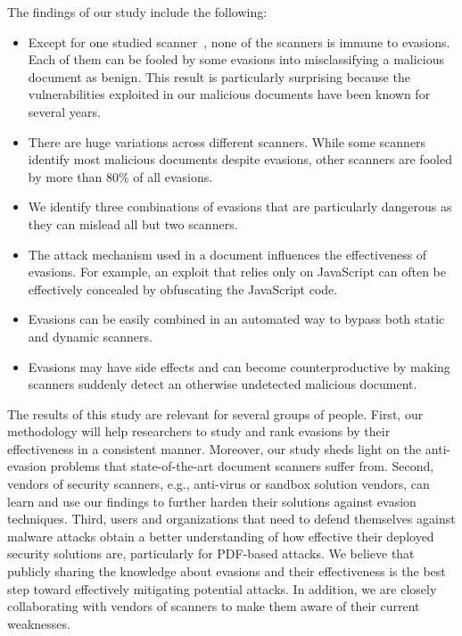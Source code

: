 The findings of our study include the following:
\begin{itemize}
  \item
    Except for one studied scanner~\cite{2018arXiv181012490J}, none of the \nbAnalyzers{} scanners is immune to evasions. 
    Each of them can be fooled by some evasions into misclassifying a 
    malicious document as benign.
    This result is particularly surprising because the vulnerabilities exploited in our malicious documents have been known for several years.

  \item
    There are huge variations across different scanners.
    While some scanners identify most malicious documents despite evasions, 
    other scanners are fooled by more than 80\% of all evasions.

  \item
    We identify three combinations of evasions that are particularly 
    dangerous as they can mislead all but two scanners.

   \item
     The attack mechanism used in a document influences the effectiveness of 
     evasions.
     For example, an exploit that relies only on JavaScript can often be 
     effectively concealed by obfuscating the JavaScript code.

   \item
     Evasions can be easily combined
     in an automated way to bypass both static and dynamic scanners.

   \item
     Evasions may have side effects and can become counterproductive by 
     making scanners suddenly detect an otherwise undetected malicious document.
\end{itemize}

The results of this study are relevant for several groups of people.
First, our methodology will help researchers to study and rank evasions by their effectiveness in a consistent manner.
Moreover, our study sheds light on the anti-evasion problems that state-of-the-art document scanners suffer from.
Second, vendors of security scanners, e.g., anti-virus or sandbox solution vendors, can learn and use our findings to further harden their solutions against evasion techniques.
Third, users and organizations that need to defend themselves against malware attacks obtain a better understanding of how effective their deployed security solutions are, particularly for PDF-based attacks.
We believe that publicly sharing the knowledge about evasions and their effectiveness is the best step toward effectively mitigating potential attacks.
In addition, we are closely collaborating with vendors of scanners to make them aware of their current weaknesses.

